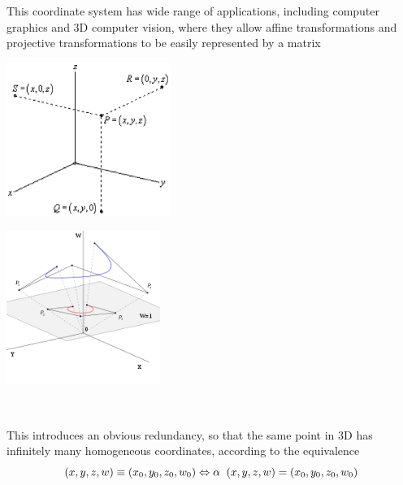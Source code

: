 \documentclass[12pt]{report}
\begin{document}
\vspace{.3cm}
This coordinate system has wide range of applications, including computer graphics and 3D computer vision, where they allow affine transformations and projective transformations to be easily represented by a matrix


\begin{multicols*}{2}

\begin{center}
  \includegraphics[height=5cm]{homoGcoord1.eps}
\end{center}



\columnbreak

\begin{center}
  \includegraphics[height=5cm]{introIm2.png}
\end{center}

\end{multicols*}



\\
\vspace{.3cm}

This introduces an obvious redundancy, so that the same point in 3D has infinitely many homogeneous coordinates, according to the equivalence
\\


\[ (x, y, z, w) \equiv (x_{0}, y_{0}, z_{0}, w_{0})   \Leftrightarrow \alpha \hspace{0.2cm} (x, y, z, w) =  (x_{0}, y_{0}, z_{0}, w_{0})  \]
\end{document}
